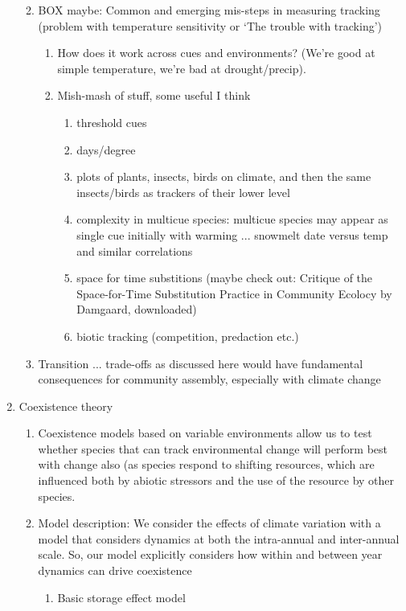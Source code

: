 \documentclass[11pt,letterpaper]{article}
\begin{document}
\begin{enumerate}
\begin{enumerate}
\begin{enumerate}
\begin{enumerate}
\end{enumerate}
\end{enumerate}
\item BOX maybe: Common and emerging mis-steps in measuring tracking (problem with temperature sensitivity or `The trouble with tracking')
\begin{enumerate}
\item How does it work across cues and environments? (We're good at simple temperature, we're bad at drought/precip).
\item Mish-mash of stuff, some useful I think
\begin{enumerate}
\item threshold cues 
\item days/degree
\item plots of plants, insects, birds on climate, and then the same insects/birds as trackers of their lower level
\item complexity in multicue species: multicue species may appear as single cue initially with warming ... snowmelt date versus temp and similar correlations
\item space for time substitions (maybe check out: Critique of the Space-for-Time Substitution Practice in Community Ecolocy by Damgaard, downloaded)
\item biotic tracking (competition, predaction etc.)
\end{enumerate}
\end{enumerate}
\item Transition ... trade-offs as discussed here would have fundamental consequences for community assembly, especially with climate change
\end{enumerate}
\item Coexistence theory
\begin{enumerate}
\item Coexistence models based on variable environments allow us to test whether species that can track environmental change will perform best with change also (as species respond to shifting resources, which are influenced both by abiotic stressors and the use of the resource by
other species.
\item Model description: We consider the effects of climate variation with a model that considers dynamics at both the
intra-annual and inter-annual scale. So, our model explicitly considers how within and between year dynamics can drive coexistence
\begin{enumerate}
\item Basic storage effect model

\end{enumerate}
\end{enumerate}
\end{enumerate}
\end{document}
